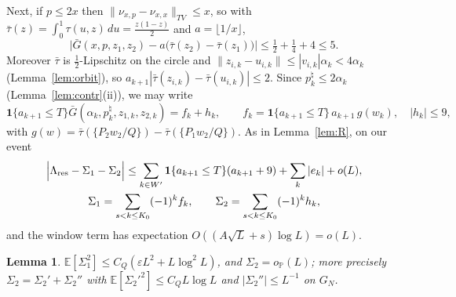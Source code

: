 \documentclass[11pt]{amsart}
\newtheorem{lemma}[theorem]{Lemma}
\theoremstyle{definition}
\numberwithin{equation}{section}
\newcommand{\E}{\mathbb{E}}
\newcommand{\Prob}{\mathbb{P}}
\newcommand{\fr}[1]{\{#1\}}
\newcommand{\eps}{\varepsilon}
\newcommand{\ind}{\mathbf{1}}
\begin{document}
Next, if $p\le2x$ then $\|\nu_{x,p}-\nu_{x,x}\|_{TV}\le x$, so with $\bar\tau(z)=\int_0^1\tau(u,z)\,du=\frac{z(1-z)}2$ and $a=\lfloor1/x\rfloor$,
\begin{equation}\label{eq:Gbarmain}
\big|\bar G(x,p,z_1,z_2)-a\big(\bar\tau(z_2)-\bar\tau(z_1)\big)\big|\le\tfrac12+\tfrac14+4\le5 .
\end{equation}
Moreover $\bar\tau$ is $\frac12$-Lipschitz on the circle and $\|z_{i,k}-u_{i,k}\|\le|v_{i,k}|\alpha_k<4\alpha_k$ (Lemma~\ref{lem:orbit}), so
$a_{k+1}|\bar\tau(z_{i,k})-\bar\tau(u_{i,k})|\le2$. Since $p^\natural_k\le2\alpha_k$ (Lemma~\ref{lem:contr}(ii)), we may write
\[
\ind\{a_{k+1}\le T\}\bar G(\alpha_k,p^\natural_k,z_{1,k},z_{2,k})=f_k+h_k,\qquad f_k=\ind\{a_{k+1}\le T\}\,a_{k+1}\,g(w_k),\quad |h_k|\le9,
\]
with $g(w)=\bar\tau(\fr{P_2w_2/Q})-\bar\tau(\fr{P_1w_2/Q})$. As in Lemma~\ref{lem:R}, on our event
\begin{gather*}
\Big|\Lambda_{\rm res}-\Sigma_1-\Sigma_2\Big|\le\sum_{k\in W'}\ind\{a_{k+1}\le T\}(a_{k+1}+9)+\sum_k|e_k|+o(L),\\
\Sigma_1=\sum_{s<k\le K_0}(-1)^kf_k,\qquad\Sigma_2=\sum_{s<k\le K_0}(-1)^kh_k ,
\end{gather*}
and the window term has expectation $O((A\sqrt L+s)\log L)=o(L)$.

\begin{lemma}\label{lem:digitsums}
$\E[\Sigma_1^2]\le C_Q(\eps L^2+L\log^2L)$, and $\Sigma_2=o_\Prob(L)$; more precisely $\Sigma_2=\Sigma_2'+\Sigma_2''$ with $\E[\Sigma_2'^2]\le C_QL\log L$ and
$|\Sigma_2''|\le L^{-1}$ on $G_N$.
\end{lemma}
\end{document}
